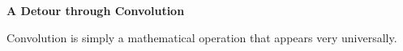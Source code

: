 \documentclass[aspectratio=169,11pt]{beamer}
\begin{document}
\begin{frame}[plain]

\vfill

\begin{center}

{\fontsize{30}{34}\selectfont\bfseries\color{FrameTitleColor}
A Detour through Convolution\par}

\vspace{0.25cm}

{\Large\color{ThemeGray}
Convolution is simply a mathematical operation that appears very universally.\par}

\end{center}

\vfill

\end{frame}
\end{document}
